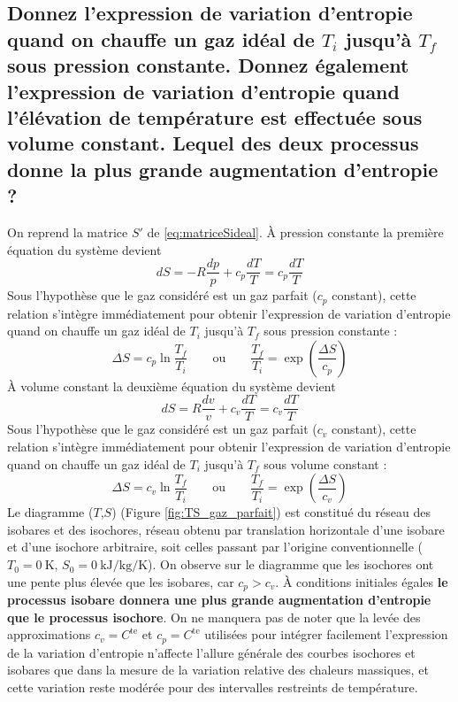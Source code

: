 \subsection{Donnez l'expression de variation d'entropie quand on chauffe un gaz idéal de $T_i$ jusqu'à $T_f$ sous pression constante. Donnez également l'expression de variation d'entropie quand l'élévation de température est effectuée sous volume constant. Lequel des deux processus donne la plus grande augmentation d'entropie ?\label{q:2_2}}
On reprend la matrice $S'$ de \ref{eq:matriceSideal}. À pression constante la première équation du système devient 
\begin{equation} dS = -R\frac{dp}{p} + c_p\frac{dT}{T} = c_p\frac{dT}{T} \end{equation}
Sous l'hypothèse que le gaz considéré est un gaz parfait ($c_p$ constant), cette relation s'intègre immédiatement pour obtenir l'expression de variation d'entropie quand on chauffe un gaz idéal de $T_i$ jusqu'à $T_f$ sous pression constante :
\begin{equation} \Delta S = c_p\ln{\frac{T_f}{T_i}} \qquad \text{ou} \qquad \frac{T_f}{T_i} = \exp\left(\frac{\Delta S}{c_p}\right) \label{eq:isobare_ideal}\end{equation}
À volume constant la deuxième équation du système devient
\begin{equation} dS = R\frac{dv}{v} + c_v\frac{dT}{T} = c_v\frac{dT}{T} \end{equation}
Sous l'hypothèse que le gaz considéré est un gaz parfait ($c_v$ constant), cette relation s'intègre immédiatement pour obtenir l'expression de variation d'entropie quand on chauffe un gaz idéal de $T_i$ jusqu'à $T_f$ sous volume constant :
\begin{equation} \Delta S = c_v\ln{\frac{T_f}{T_i}} \qquad \text{ou} \qquad \frac{T_f}{T_i} = \exp\left(\frac{\Delta S}{c_v}\right) \label{eq:isochore_ideal}\end{equation}
Le diagramme ($T$,$S$) (Figure \ref{fig:TS_gaz_parfait}) est constitué du réseau des isobares et des isochores, réseau obtenu par translation horizontale d'une isobare et d'une isochore arbitraire, soit celles passant par l'origine conventionnelle ($T_0 = \SI{0}{\kelvin}$, $S_0 = \SI{0}{\kilo\joule\per\kilo\gram\per\kelvin}$). On observe sur le diagramme que les isochores ont une pente plus élevée que les isobares, car $c_p > c_v$. À conditions initiales égales \textbf{le processus isobare donnera une plus grande augmentation d'entropie que le processus isochore}. 
On ne manquera pas de noter que la levée des approximations $c_v = C^\text{te}$ et $c_p = C^\text{te}$ utilisées pour intégrer facilement l'expression de la variation d'entropie n'affecte l'allure générale des courbes isochores et isobares que dans la mesure de la variation relative des chaleurs massiques, et cette variation reste modérée pour des intervalles restreints de température.
